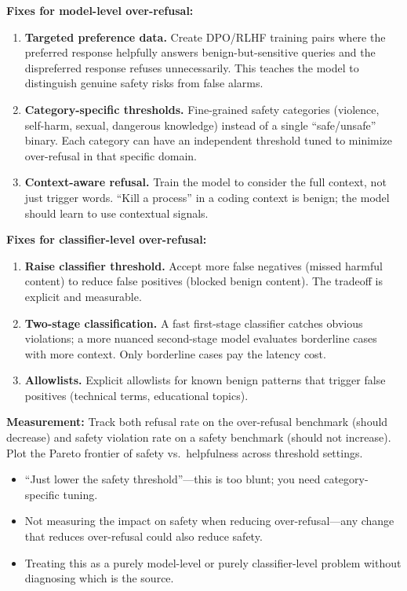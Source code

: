 \begin{interviewq}
\textbf{Fixes for model-level over-refusal:}
\begin{enumerate}
    \item \textbf{Targeted preference data.} Create DPO/RLHF training pairs where the preferred response helpfully answers benign-but-sensitive queries and the dispreferred response refuses unnecessarily. This teaches the model to distinguish genuine safety risks from false alarms.
    \item \textbf{Category-specific thresholds.} Fine-grained safety categories (violence, self-harm, sexual, dangerous knowledge) instead of a single ``safe/unsafe'' binary. Each category can have an independent threshold tuned to minimize over-refusal in that specific domain.
    \item \textbf{Context-aware refusal.} Train the model to consider the full context, not just trigger words. ``Kill a process'' in a coding context is benign; the model should learn to use contextual signals.
\end{enumerate}

\textbf{Fixes for classifier-level over-refusal:}
\begin{enumerate}
    \item \textbf{Raise classifier threshold.} Accept more false negatives (missed harmful content) to reduce false positives (blocked benign content). The tradeoff is explicit and measurable.
    \item \textbf{Two-stage classification.} A fast first-stage classifier catches obvious violations; a more nuanced second-stage model evaluates borderline cases with more context. Only borderline cases pay the latency cost.
    \item \textbf{Allowlists.} Explicit allowlists for known benign patterns that trigger false positives (technical terms, educational topics).
\end{enumerate}

\textbf{Measurement:} Track both refusal rate on the over-refusal benchmark (should decrease) and safety violation rate on a safety benchmark (should not increase). Plot the Pareto frontier of safety vs.\ helpfulness across threshold settings.

\redflags
\begin{itemize}
    \item ``Just lower the safety threshold''---this is too blunt; you need category-specific tuning.
    \item Not measuring the impact on safety when reducing over-refusal---any change that reduces over-refusal could also reduce safety.
    \item Treating this as a purely model-level or purely classifier-level problem without diagnosing which is the source.
\end{itemize}


\end{interviewq}
